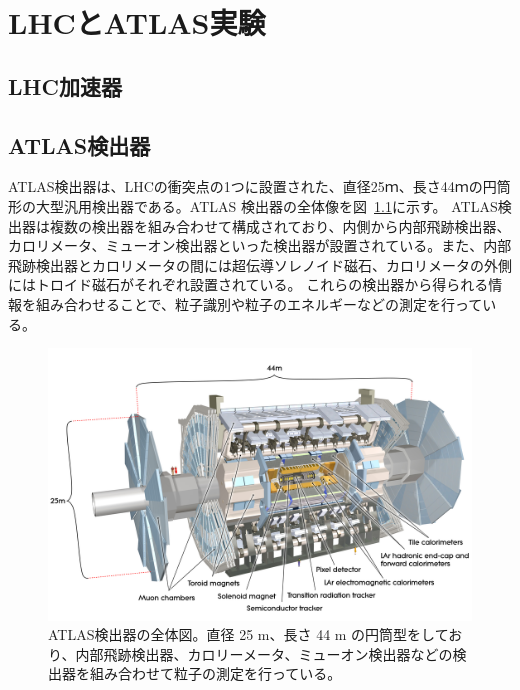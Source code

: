 \chapter{LHCとATLAS実験}\label{chapter2}

\section{LHC加速器}\label{section2-1}
\section{ATLAS検出器}\label{section2-2}

ATLAS検出器は、LHCの衝突点の1つに設置された、直径25ｍ、長さ44ｍの円筒形の大型汎用検出器である\cite{Aad:1129811}。ATLAS 検出器の全体像を図~\ref{fig:ATLAS検出器}に示す。
ATLAS検出器は複数の検出器を組み合わせて構成されており、内側から内部飛跡検出器、カロリメータ、ミューオン検出器といった検出器が設置されている。また、内部飛跡検出器とカロリメータの間には超伝導ソレノイド磁石、カロリメータの外側にはトロイド磁石がそれぞれ設置されている。
これらの検出器から得られる情報を組み合わせることで、粒子識別や粒子のエネルギーなどの測定を行っている。

\begin{figure}[tb]
  \centering
  \includegraphics[clip,width=12cm]{fig/2/0803012_01.jpg}
  \caption{ATLAS検出器の全体図\cite{Aad:1129811}。直径 25 m、長さ 44 m の円筒型をしており、内部飛跡検出器、カロリーメータ、ミューオン検出器などの検出器を組み合わせて粒子の測定を行っている。}
  \label{fig:ATLAS検出器}
\end{figure}

